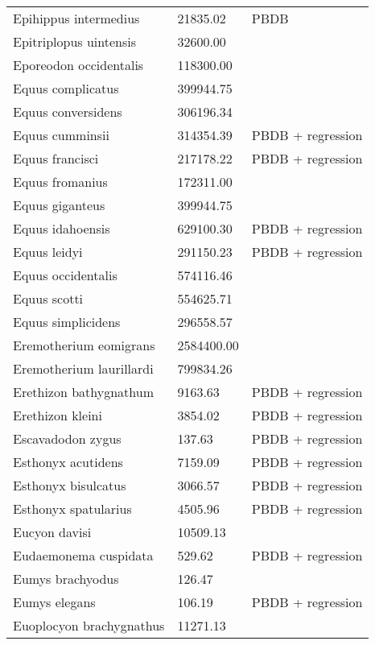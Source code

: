 \documentclass{article}
\begin{document}
\begin{center}
\begin{longtable}{p{} p{} p{}}
    Epihippus intermedius & 21835.02 & PBDB \\ 
    Epitriplopus uintensis & 32600.00 & \cite{MacFadden1986} \\ 
    Eporeodon occidentalis & 118300.00 & \cite{McKenna2011} \\ 
    Equus complicatus & 399944.75 & \cite{Smith2004} \\ 
    Equus conversidens & 306196.34 & \cite{Smith2004} \\ 
    Equus cumminsii & 314354.39 & PBDB + regression \\ 
    Equus francisci & 217178.22 & PBDB + regression \\ 
    Equus fromanius & 172311.00 & \cite{McKenna2011} \\ 
    Equus giganteus & 399944.75 & \cite{Smith2004} \\ 
    Equus idahoensis & 629100.30 & PBDB + regression \\ 
    Equus leidyi & 291150.23 & PBDB + regression \\ 
    Equus occidentalis & 574116.46 & \cite{Smith2004} \\ 
    Equus scotti & 554625.71 & \cite{Smith2004} \\ 
    Equus simplicidens & 296558.57 & \cite{Tomiya2013} \\ 
    Eremotherium eomigrans & 2584400.00 & \cite{McDonald2005} \\ 
    Eremotherium laurillardi & 799834.26 & \cite{Smith2004} \\ 
    Erethizon bathygnathum & 9163.63 & PBDB + regression \\ 
    Erethizon kleini & 3854.02 & PBDB + regression \\ 
    Escavadodon zygus & 137.63 & PBDB + regression \\ 
    Esthonyx acutidens & 7159.09 & PBDB + regression \\ 
    Esthonyx bisulcatus & 3066.57 & PBDB + regression \\ 
    Esthonyx spatularius & 4505.96 & PBDB + regression \\ 
    Eucyon davisi & 10509.13 & \cite{Tomiya2013} \\ 
    Eudaemonema cuspidata & 529.62 & PBDB + regression \\ 
    Eumys brachyodus & 126.47 & \cite{Tomiya2013} \\ 
    Eumys elegans & 106.19 & PBDB + regression \\ 
    Euoplocyon brachygnathus & 11271.13 & \cite{Tomiya2013} \\ 

\end{longtable}
\end{center}
\end{document}
